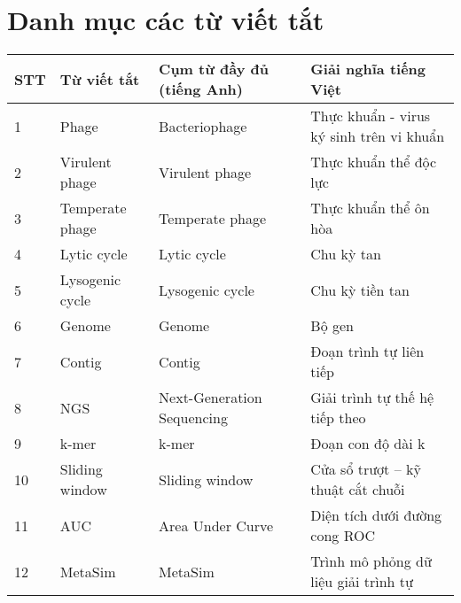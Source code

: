 \chapter*{Danh mục các từ viết tắt}
 
\begin{tabular}{|m{1cm}|m{3cm}|m{4cm}|m{6cm}|}
    \hline
\textbf{STT} & \textbf{Từ viết tắt} & \textbf{Cụm từ đầy đủ (tiếng Anh)} & \textbf{Giải nghĩa tiếng Việt} \\
\hline
1 & Phage & Bacteriophage & Thực khuẩn - virus ký sinh trên vi khuẩn \\
\hline
2 & Virulent phage & Virulent phage & Thực khuẩn thể độc lực \\
\hline
3 & Temperate phage & Temperate phage & Thực khuẩn thể ôn hòa \\
\hline
4 & Lytic cycle & Lytic cycle & Chu kỳ tan \\
\hline
5 & Lysogenic cycle & Lysogenic cycle & Chu kỳ tiền tan \\
\hline
6 & Genome & Genome & Bộ gen \\
\hline
7 & Contig & Contig & Đoạn trình tự liên tiếp \\
\hline
8 & NGS & Next-Generation Sequencing & Giải trình tự thế hệ tiếp theo \\
\hline
9 & k-mer & k-mer & Đoạn con độ dài k \\
\hline
10 & Sliding window & Sliding window & Cửa sổ trượt – kỹ thuật cắt chuỗi \\
\hline
11 & AUC & Area Under Curve & Diện tích dưới đường cong ROC \\
\hline
12 & MetaSim & MetaSim & Trình mô phỏng dữ liệu giải trình tự \\
\hline
\end{tabular}
